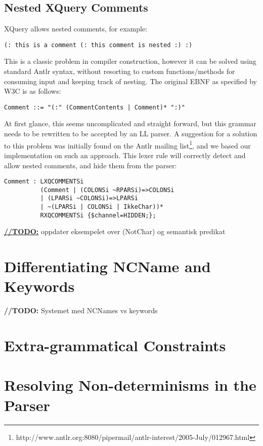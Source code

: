 \subsection{Nested XQuery Comments}
XQuery allows nested comments, for example:
\begin{verbatim}
(: this is a comment (: this comment is nested :) :)
\end{verbatim}
This is a classic problem in compiler construction, however it can be solved
using standard Antlr syntax, without resorting to custom functions/methods for
consuming input and keeping track of nesting. The original EBNF as specified by
W3C is as follows:
\begin{verbatim}
Comment ::= "(:" (CommentContents | Comment)* ":)"
\end{verbatim}
At first glance, this seems uncomplicated and straight forward, but this grammar
needs to be rewritten to be accepted by an LL parser. A suggestion for a 
solution to this problem was initially found on the Antlr mailing
list\footnote{http://www.antlr.org:8080/pipermail/antlr-interest/2005-July/012967.html},
and we based our implementation on such an approach. This lexer rule will
correctly detect and allow nested comments, and hide them from the parser:
\begin{verbatim}	
Comment : LXQCOMMENTSi 
          (Comment | (COLONSi ~RPARSi)=>COLONSi 
          | (LPARSi ~COLONSi)=>LPARSi 
          | ~(LPARSi | COLONSi | IkkeChar))* 
          RXQCOMMENTSi {$channel=HIDDEN;};
\end{verbatim}

\underline{\textbf{\LARGE //TODO:}} oppdater eksempelet over (NotChar) og semantisk predikat

\section{Differentiating NCName and Keywords}

\textbf{\LARGE //TODO:} Systemet med NCNames vs keywords

\section{Extra-grammatical Constraints}

\section{Resolving Non-determinisms in the Parser }


